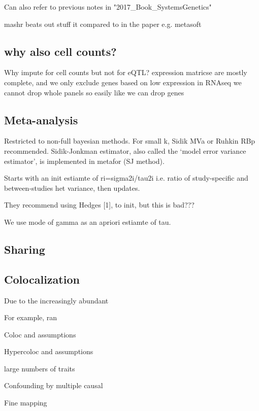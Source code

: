 Can also refer to previous notes in "2017\_Book\_SystemsGenetics"

mashr beats out stuff it compared to in the paper e.g. metasoft

\subsection{why also cell counts?}


Why impute for cell counts but not for eQTL?
expression matricse are mostly complete, and we only exclude genes based on low expression in RNAseq
we cannot drop whole panels so easily like we can drop genes

\subsection{Meta-analysis}

Restricted to non-full bayesian methods.
For small k, Sidik MVa or Ruhkin RBp recommended.
Sidik-Jonkman estimator, also called the ‘model error variance estimator’, is implemented in metafor (SJ method).

Starts with an init estiamte of ri=sigma2i/tau2i i.e. ratio of study-specific and between-studies het variance, then updates.

They recommend using Hedges [1], to init, but this is bad???

We use mode of gamma as an apriori estiamte of tau.

\subsection{Sharing}

\subsection{Colocalization}



Due to the increasingly abundant

For example, ran 

Coloc and assumptions

Hypercoloc and assumptions

large numbers of traits

Confounding by multiple causal

Fine mapping

